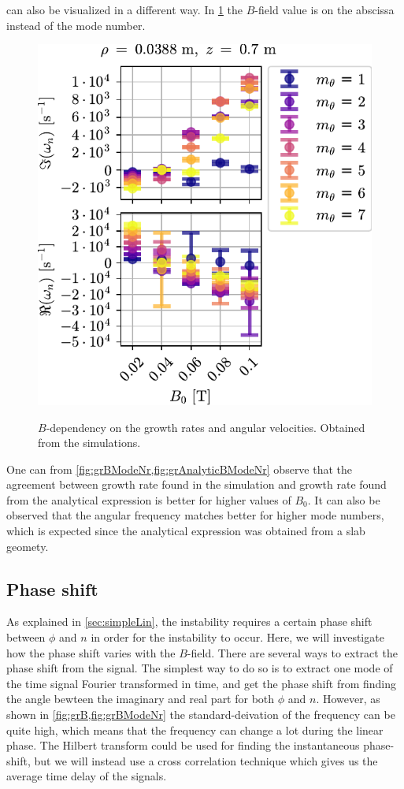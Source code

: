  can also be visualized in a different way.
In \cref{fig:grBModeNr} the $B$-field value is on the abscissa instead of the mode number.
%
\begin{figure}[htb]
        \centering
        \includegraphics{fig/results/growthRates/growthRatesB0ModeNr}
        \label{fig:grBModeNr}
        \caption{$B$-dependency on the growth rates and angular velocities.
            Obtained from the simulations.}
\end{figure}
%
One can from \cref{fig:grBModeNr,fig:grAnalyticBModeNr} observe that the agreement between growth rate found in the simulation and growth rate found from the analytical expression is better for higher values of $B_0$.
It can also be observed that the angular frequency matches better for higher mode numbers, which is expected since the analytical expression was obtained from a slab geomety.

\subsection{Phase shift}
%
As explained in \ref{sec:simpleLin}, the instability requires a certain phase shift between $\phi$ and $n$ in order for the instability to occur.
Here, we will investigate how the phase shift varies with the $B$-field.
There are several ways to extract the phase shift from the signal.
The simplest way to do so is to extract one mode of the time signal Fourier transformed in time, and get the phase shift from finding the angle bewteen the imaginary and real part for both $\phi$ and $n$.
However, as shown in \cref{fig:grB,fig:grBModeNr} the standard-deivation of the frequency can be quite high, which means that the frequency can change a lot during the linear phase.
The Hilbert transform could be used for finding the instantaneous phase-shift, but we will instead use a cross correlation technique which gives us the average time delay of the signals.

